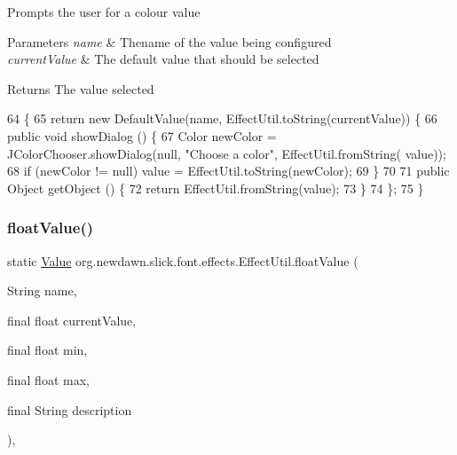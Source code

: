 Prompts the user for a colour value


\begin{DoxyParams}{Parameters}
{\em name} & Thename of the value being configured \\
\hline
{\em current\+Value} & The default value that should be selected \\
\hline
\end{DoxyParams}
\begin{DoxyReturn}{Returns}
The value selected 
\end{DoxyReturn}

\begin{DoxyCode}
64                                                                     \{
65         \textcolor{keywordflow}{return} \textcolor{keyword}{new} DefaultValue(name, EffectUtil.toString(currentValue)) \{
66             \textcolor{keyword}{public} \textcolor{keywordtype}{void} showDialog () \{
67                 Color newColor = JColorChooser.showDialog(null, \textcolor{stringliteral}{"Choose a color"}, EffectUtil.fromString(
      value));
68                 \textcolor{keywordflow}{if} (newColor != null) value = EffectUtil.toString(newColor);
69             \}
70 
71             \textcolor{keyword}{public} Object getObject () \{
72                 \textcolor{keywordflow}{return} EffectUtil.fromString(value);
73             \}
74         \};
75     \}
\end{DoxyCode}
\mbox{\label{classorg_1_1newdawn_1_1slick_1_1font_1_1effects_1_1_effect_util_a146f4a4f2ef4ea6e5b1ac388911a0c46}} 
\subsubsection{\texorpdfstring{float\+Value()}{floatValue()}}
{\footnotesize\ttfamily static \mbox{\hyperlink{interfaceorg_1_1newdawn_1_1slick_1_1font_1_1effects_1_1_configurable_effect_1_1_value}{Value}} org.\+newdawn.\+slick.\+font.\+effects.\+Effect\+Util.\+float\+Value (\begin{DoxyParamCaption}\item[{String}]{name,  }\item[{final float}]{current\+Value,  }\item[{final float}]{min,  }\item[{final float}]{max,  }\item[{final String}]{description }\end{DoxyParamCaption})\hspace{0.3cm}{\ttfamily [inline]}, {\ttfamily [static]}}

